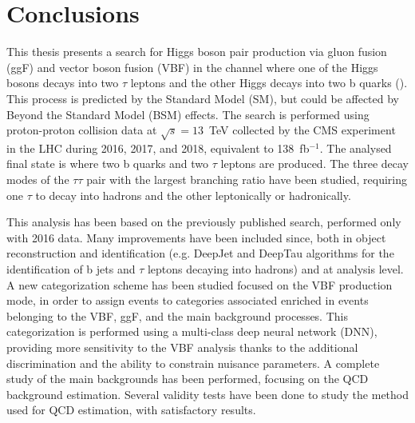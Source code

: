 \documentclass[main.tex]{subfiles}
\begin{document}
\thispagestyle{plain}
\chapter*{Conclusions}

This thesis presents a search for Higgs boson pair production via gluon fusion (ggF) and vector boson fusion (VBF) in the channel where one of the Higgs bosons decays into two $\tau$ leptons and the other Higgs decays into two b quarks (\hhbbtt{}). This process is predicted by the Standard Model (SM), but could be affected by Beyond the Standard Model (BSM) effects. The search is performed using proton-proton collision data at $\sqrt{s}=13$~TeV collected by the CMS experiment in the LHC during 2016, 2017, and 2018, equivalent to 138~fb${}^{-1}$. The analysed final state is where two b quarks and two $\tau$ leptons are produced. The three decay modes of the $\tau\tau$ pair with the largest branching ratio have been studied, requiring one $\tau$ to decay into hadrons and the other leptonically or hadronically.

This analysis has been based on the previously published \hhbbtt{} search, performed only with 2016 data. Many improvements have been included since, both in object reconstruction and identification (e.g. DeepJet and DeepTau algorithms for the identification of b jets and $\tau$ leptons decaying into hadrons) and at analysis level. A new categorization scheme has been studied focused on the VBF production mode, in order to assign events to categories associated enriched in events belonging to the VBF, ggF, and the main background processes. This categorization is performed using a multi-class deep neural network (DNN), providing more sensitivity to the VBF analysis thanks to the additional discrimination and the ability to constrain nuisance parameters. A complete study of the main backgrounds has been performed, focusing on the QCD background estimation. Several validity tests have been done to study the method used for QCD estimation, with satisfactory results.
\end{document}
